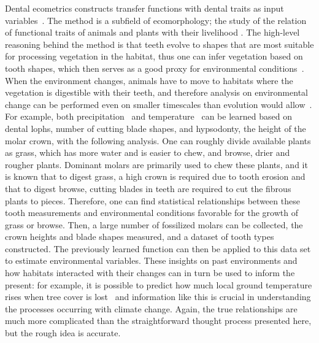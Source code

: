 \documentclass[english,twoside,openright]{UH_DS_MSc}
\begin{document}
Dental ecometrics constructs transfer functions with dental traits as input variables~\cite{Faith_Lyman_2019_ch9, oksanenHumboldtianApproachLife2019}.
The method is a subfield of ecomorphology; the study of the relation of functional traits of animals and plants with their livelihood
\cite{oksanenHumboldtianApproachLife2019}. The high-level reasoning behind the method is that teeth evolve to 
shapes that are most suitable for processing vegetation in the habitat, thus one can infer vegetation based on tooth shapes, 
which then serves as a good proxy for environmental conditions~\cite{oksanenHumboldtianApproachLife2019}. 
When the environment changes, animals have to move to habitats where the vegetation is digestible with their teeth, and therefore
analysis on environmental change can be performed even on smaller timescales than evolution would allow~\cite{fortelius}. For example, both precipitation~\cite{fortelius}
and temperature~\cite{oksanenHumboldtianApproachLife2019} can be learned based on dental lophs, number of cutting blade shapes, and hypsodonty, the height of the
molar crown, with the following analysis. One can roughly divide available plants as grass, which has more water and is easier to chew, and 
browse, drier and rougher plants. Dominant molars are primarily used to chew these plants, and it is known that to digest grass, a high 
crown is required due to tooth erosion and that to digest browse, cutting blades in teeth are required to cut the fibrous plants to pieces.
Therefore, one can find statistical relationships between these tooth measurements and environmental conditions favorable 
for the growth of grass or browse. Then, a large number of fossilized molars can be collected, the crown heights and blade shapes measured, and a dataset of 
tooth types constructed. The previously learned function can then be applied to this data set
 to estimate environmental variables. These insights on 
 past environments and how habitats interacted with their changes can 
 in turn be used to inform the present: for example, it is possible to predict how much local ground temperature rises when tree cover is lost~\cite{fortelius} and
information like this is crucial in understanding the processes occurring with climate
change.
  Again, the true relationships are much more complicated 
 than the straightforward thought process presented here, but the rough idea is accurate.
\end{document}
